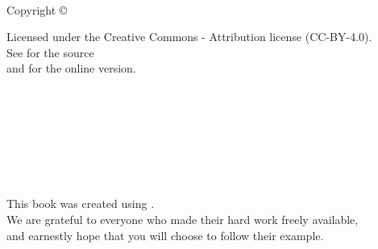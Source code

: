 \documentclass[10pt,statementpaper]{memoir}
\begin{document}
\pagestyle{empty}

{\begingroup
  \raggedleft
  \vspace*{\baselineskip}

{\Huge\itshape \sitetitle{}}\\[\baselineskip]

\ifdefempty{\sitesubtitle}{}{\large\itshape\sitesubtitle{}\\[0.2\textheight]}

{\large \siteauthor{}}\par

\vfill

{\large Copyright {\copyright} \siteyear{}}

\vspace*{\baselineskip}


\vspace*{\baselineskip}

{\small
  \begin{flushright}
  Licensed under the Creative Commons - Attribution license (CC-BY-4.0).
  \\
  See \siterepo{} for the source
  \\
  and \siteurl{} for the online version.
  \\
  \sitecover{}
  \end{flushright}
}

\endgroup}



\newpage
\pagestyle{empty}

~

\newpage
{}
\tableofcontents

\newpage
\pagestyle{empty}

~

\newpage
\listoffigures

\newpage
\pagestyle{empty}

~

\newpage
\listoftables

\newpage
\pagestyle{empty}

~

\newpage
\pagestyle{plain}



\cleartoverso
{\begingroup
  \raggedleft
  \vspace*{4\baselineskip}
  This book was created using \sitetools{}. \\
  We are grateful to everyone who made their hard work freely available, \\
  and earnestly hope that you will choose to follow their example.

\endgroup}
\end{document}
